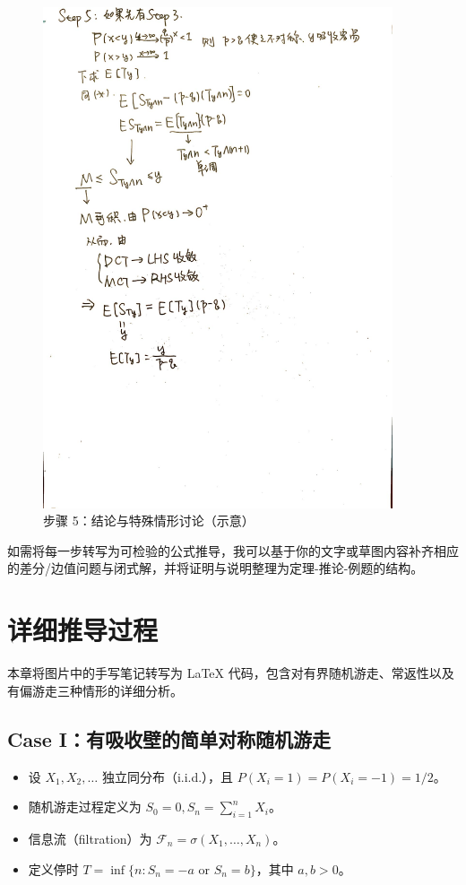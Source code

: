 \documentclass[12pt, a4paper, oneside, fontset=windows]{ctexbook}
\begin{document}
\begin{figure}[h]
	\centering
	\includegraphics[width=0.92\textwidth]{5.jpg}
	\caption{步骤 5：结论与特殊情形讨论（示意）}\label{fig:rw-step5}
\end{figure}

\vspace{1em}
\noindent
如需将每一步转写为可检验的公式推导，我可以基于你的文字或草图内容补齐相应的差分/边值问题与闭式解，并将证明与说明整理为定理-推论-例题的结构。

\chapter{详细推导过程}
本章将图片中的手写笔记转写为 LaTeX 代码，包含对有界随机游走、常返性以及有偏游走三种情形的详细分析。

\section{Case I：有吸收壁的简单对称随机游走}
\begin{itemize}
    \item 设 $X_1, X_2, \dots$ 独立同分布（i.i.d.），且 $P(X_i=1) = P(X_i=-1) = 1/2$。
    \item 随机游走过程定义为 $S_0=0, S_n = \sum_{i=1}^n X_i$。
    \item 信息流（filtration）为 $\mathcal{F}_n = \sigma(X_1, \dots, X_n)$。
    \item 定义停时 $T = \inf\{n: S_n = -a \text{ or } S_n = b\}$，其中 $a,b > 0$。
\end{itemize}
\end{document}
